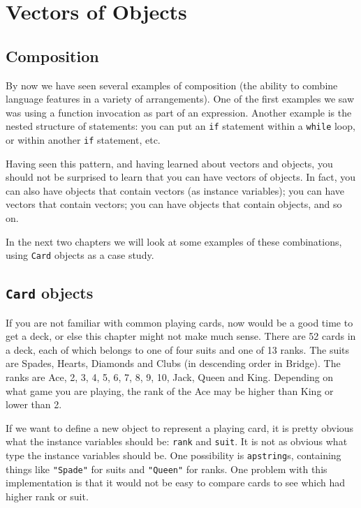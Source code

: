 


\chapter{Vectors of Objects}

\section{Composition}

By now we have seen several examples of composition (the ability to
combine language features in a variety of arrangements).  One of the
first examples we saw was using a function invocation as part of an
expression.  Another example is the nested structure of statements:
you can put an {\tt if} statement within a {\tt while} loop, or within
another {\tt if} statement, etc.

Having seen this pattern, and having learned about vectors and objects,
you should not be surprised to learn that you can have vectors of
objects.  In fact, you can also have objects that contain vectors (as
instance variables); you can have vectors that contain vectors; you can
have objects that contain objects, and so on.

In the next two chapters we will look at some examples of these
combinations, using {\tt Card} objects as a case study.

\section{{\tt Card} objects}

If you are not familiar with common playing cards, now would be a good
time to get a deck, or else this chapter might not make much sense.
There are 52 cards in a deck, each of which belongs to one of four
suits and one of 13 ranks.  The suits are Spades, Hearts, Diamonds and
Clubs (in descending order in Bridge).  The ranks are Ace, 2, 3, 4, 5,
6, 7, 8, 9, 10, Jack, Queen and King.  Depending on what game you are
playing, the rank of the Ace may be higher than King or lower than 2.


If we want to define a new object to represent a playing card, it is
pretty obvious what the instance variables should be: {\tt rank} and
{\tt suit}.  It is not as obvious what type the instance variables
should be.  One possibility is {\tt apstring}s, containing things like
{\tt "Spade"} for suits and {\tt "Queen"} for ranks.  One problem with
this implementation is that it would not be easy to compare cards to
see which had higher rank or suit.

